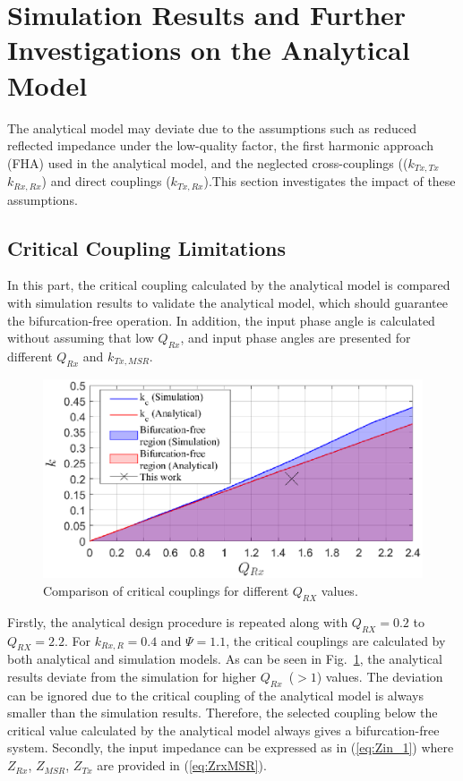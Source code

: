 \documentclass[journal]{IEEEtran}
\begin{document}
\section{Simulation Results and Further Investigations on the Analytical Model}
The analytical model may deviate due to the assumptions such as reduced reflected impedance under the low-quality factor, the first harmonic approach (FHA) used in the analytical model, and the neglected cross-couplings (($k_{Tx,Tx}$  $k_{Rx,Rx}$) and direct couplings ($k_{Tx,Rx}$).This section investigates the impact of these assumptions.

\subsection{Critical Coupling Limitations}
In this part, the critical coupling calculated by the analytical model is compared with simulation results to validate the analytical model, which should guarantee the bifurcation-free operation. In addition, the input phase angle is calculated without assuming that low $Q_{Rx}$, and input phase angles are presented for different $Q_{Rx} $ and $k_{Tx,MSR}$. 
\begin{figure}[h!]
    \centering
    \includegraphics[width=0.92\linewidth]{critical_coupling.eps}
    \caption{Comparison of critical couplings for different $Q_{RX}$ values. }
    \label{fig:critical coupling}
\end{figure}

Firstly, the analytical design procedure is repeated along with $Q_{RX}=0.2$ to $Q_{RX}=2.2$.
For $k_{Rx,R}=0.4$ and $\Psi=1.1$,  the critical couplings are calculated by both analytical and simulation models. 
As can be seen in Fig.~\ref{fig:critical coupling}, the analytical results deviate from the simulation for higher $Q_{Rx}$~($>1$) values. 
The deviation can be ignored due to the critical coupling of the analytical model is always smaller than the simulation results. Therefore, the selected coupling below the critical value calculated by the analytical model always gives a bifurcation-free system.
Secondly, the input impedance can be expressed as in  (\ref{eq:Zin_1}) where $Z_{Rx}$, $Z_{MSR}$, $Z_{Tx}$ are provided in (\ref{eq:ZrxMSR}).
\end{document}
